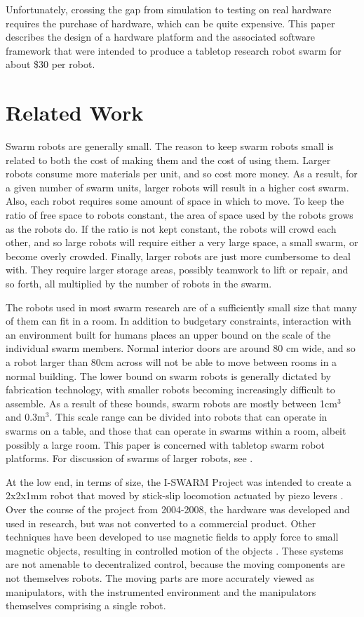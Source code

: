 \documentclass[]{article}
\begin{document}
Unfortunately, crossing the gap from simulation to testing on real hardware requires the purchase of hardware, which can be quite expensive. 
This paper describes the design of a hardware platform and the associated software framework that were intended to produce a tabletop research robot swarm for about \$30 per robot. 


\section{Related Work}

Swarm robots are generally small. 
The reason to keep swarm robots small is related to both the cost of making them and the cost of using them. 
Larger robots consume more materials per unit, and so cost more money.
As a result, for a given number of swarm units, larger robots will result in a higher cost swarm. 
Also, each robot requires some amount of space in which to move.
To keep the ratio of free space to robots constant, the area of space used by the robots grows as the robots do. 
If the ratio is not kept constant, the robots will crowd each other, and so large robots will require either a very large space, a small swarm, or become overly crowded.
Finally, larger robots are just more cumbersome to deal with. 
They require larger storage areas, possibly teamwork to lift or repair, and so forth, all multiplied by the number of robots in the swarm. 

The robots used in most swarm research are of a sufficiently small size that many of them can fit in a room. In addition to budgetary constraints, interaction with an environment built for humans places an upper bound on the scale of the individual swarm members. 
Normal interior doors are around 80 cm wide, and so a robot larger than 80cm across will not be able to move between rooms in a normal building.
The lower bound on swarm robots is generally dictated by fabrication technology, with smaller robots becoming increasingly difficult to assemble. 
As a result of these bounds, swarm robots are mostly between 1cm$^3$ and 0.3m$^3$. 
This scale range can be divided into robots that can operate in swarms on a table, and those that can operate in swarms within a room, albeit possibly a large room. 
This paper is concerned with tabletop swarm robot platforms.
For discussion of swarms of larger robots, see \cite{olson2013cacm, dorigo2013swarmanoid, bonani2010marxbot, tammet2008rfid, guo2007bio}. 

At the low end, in terms of size, the I-SWARM Project was intended to create a 2x2x1mm robot that moved by stick-slip locomotion actuated by piezo levers \cite{seyfried2005swarm}. 
Over the course of the project from 2004-2008, the hardware was developed and used in research, but was not converted to a commercial product.
Other techniques have been developed to use magnetic fields to apply force to small magnetic objects, resulting in controlled motion of the objects \cite{floyd2008untethered, pelrine2012diamagnetically}.
These systems are not amenable to decentralized control, because the moving components are not themselves robots. 
The moving parts are more accurately viewed as manipulators, with the instrumented environment and the manipulators themselves comprising a single robot. 
\end{document}
